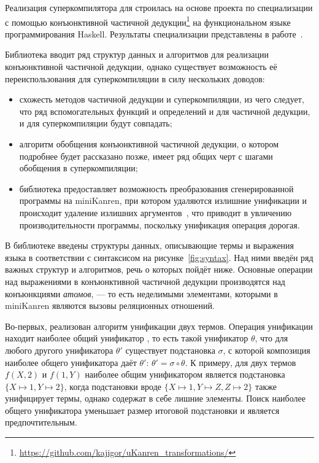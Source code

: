 Реализация суперкомпилятора для \ukanren строилась на основе проекта по специализации \ukanren с помощью конъюнктивной частичной
дедукции\footnote{\url{https://github.com/kajigor/uKanren_transformations/}} на функциональном языке программирования Haskell.
Результаты специализации \ukanren представлены в работе~\cite{lozov}.

Библиотека вводит ряд структур данных и алгоритмов для реализации конъюнктивной частичной дедукции,
однако существует возможность её переиспользования для суперкомпиляции в силу нескольких доводов:
\begin{itemize}
\item схожесть методов частичной дедукции и суперкомпиляции\cite{pdAndDriving},
      из чего следует, что ряд вспомогательных функций и определений и для частичной дедукции, и для суперкомпиляции
      будут совпадать;
\item алгоритм обобщения конъюнктивной частичной дедукции\cite{cpd}, о котором подробнее будет рассказано позже,
      имеет ряд общих черт с шагами обобщения в суперкомпиляции;
\item библиотека предоставляет возможность преобразования сгенерированной программы
      на miniKanren, при котором удаляются излишние унификации и
      происходит удаление излишних аргументов~,
      что приводит в увличению производительности программы, поскольку унификация операция дорогая.
\end{itemize}

В библиотеке введены структуры данных, описывающие термы и выражения языка
в соответствии с синтаксисом \ukanren на рисунке~\ref{fig:syntax}.
Над ними введён ряд важных структур и алгоритмов, речь о которых пойдёт ниже.
Основные операции над выражениями в конъюнктивной частичной дедукции производятся над конъюнкциями
\emph{атомов}, --- то есть неделимыми элементами, которыми в miniKanren являются
вызовы реляционных отношений.


Во-первых, реализован алгоритм унификации двух термов.
Операция унификации находит наиболее общий унификатор , то есть такой
унификатор $\theta$, что для любого другого унификатора $\theta'$ существует подстановка $\sigma$,
с которой композиция наиболее общего унификатора даёт $\theta'$: $\theta' = \sigma \circ \theta$\cite{unification}.
К примеру, для двух термов $f(X, 2)$ и $f(1, Y)$ наиболее общим унификатором является
подстановка $\{ X \mapsto 1, Y \mapsto 2 \}$, когда подстановки вроде
$\{ X \mapsto 1, Y \mapsto Z, Z \mapsto 2 \}$ также унифицирует термы, однако
содержат в себе лишние элементы. Поиск наиболее общего унификатора уменьшает
размер итоговой подстановки и является предпочтительным.

